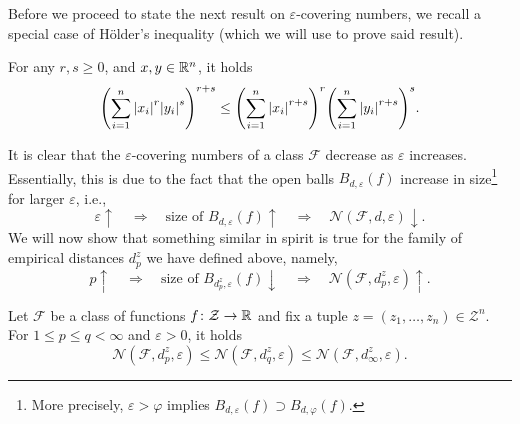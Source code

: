 Before we proceed to state the next result on $\varepsilon$-covering numbers, we recall a special case of H{\"o}lder's inequality (which we will use to prove said result).

\begin{proposition}[H{\"o}lder, 1889]
\label{prop: hoelder}
For any $r, s \geq 0$, and $x, y \in \mathbb{R}^n$, it holds
\[
    \left(\sum_{i=1}^n \abs{x_i}^r \abs{y_i}^s \right)^{r+s} \leq \left(\sum_{i=1}^n \abs{x_i}^{r+s}\right)^r \left(\sum_{i=1}^n \abs{y_i}^{r+s}\right)^s.
\]
\end{proposition}

It is clear that the $\varepsilon$-covering numbers of a class $\mathcal{F}$ decrease as $\varepsilon$ increases. Essentially, this is due to the fact that the open balls $B_{d, \varepsilon}(f)$ increase in size\footnote{More precisely, $\varepsilon > \varphi$ implies $B_{d, \varepsilon}(f) \supset B_{d, \varphi}(f)$.} for larger $\varepsilon$, i.e.,
\[
    \varepsilon \uparrow \quad \Rightarrow \quad \text{size of } B_{d, \varepsilon}(f) \uparrow \quad \Rightarrow \quad \mathcal{N}(\mathcal{F}, d, \varepsilon) \downarrow.
\]
We will now show that something similar in spirit is true for the family of empirical distances $d_p^z$ we have defined above, namely,
\[
    p \uparrow \quad \Rightarrow \quad \text{size of } B_{d_p^z, \varepsilon}(f) \downarrow \quad \Rightarrow \quad \mathcal{N}(\mathcal{F}, d_p^z, \varepsilon) \uparrow.
\]

\begin{proposition}
Let $\mathcal{F}$ be a class of functions $f \colon \mathcal{Z} \to \mathbb{R}$ and fix a tuple $z = (z_1, \dots, z_n) \in \mathcal{Z}^n$. For $1 \leq p \leq q < \infty$ and $\varepsilon > 0$, it holds
\[
    \mathcal{N}(\mathcal{F}, d_p^z, \varepsilon) \leq \mathcal{N}(\mathcal{F}, d_q^z, \varepsilon) \leq \mathcal{N}(\mathcal{F}, d_{\infty}^z, \varepsilon).
\]
\end{proposition}

